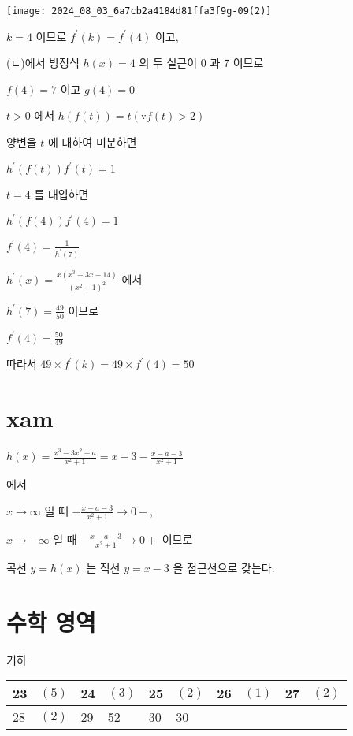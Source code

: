 \documentclass[10pt]{article}
\begin{document}
\begin{center}
\texttt{[image: 2024\_08\_03\_6a7cb2a4184d81ffa3f9g-09(2)]}
\end{center}

\(k=4\) 이므로 \(f^{\prime}(k)=f^{\prime}(4)\) 이고,

(ㄷ)에서 방정식 \(h(x)=4\) 의 두 실근이 0 과 7 이므로

\(f(4)=7\) 이고 \(g(4)=0\)

\(t>0\) 에서 \(h(f(t))=t(\because f(t)>2)\)

양변을 \(t\) 에 대하여 미분하면

\(h^{\prime}(f(t)) f^{\prime}(t)=1\)

\(t=4\) 를 대입하면

\(h^{\prime}(f(4)) f^{\prime}(4)=1\)

\(f^{\prime}(4)=\frac{1}{h^{\prime}(7)}\)

\(h^{\prime}(x)=\frac{x\left(x^{3}+3 x-14\right)}{\left(x^{2}+1\right)^{2}}\) 에서

\(h^{\prime}(7)=\frac{49}{50}\) 이므로

\(f^{\prime}(4)=\frac{50}{49}\)

따라서 \(49 \times f^{\prime}(k)=49 \times f^{\prime}(4)=50\)

\section*{xam}
\(h(x)=\frac{x^{3}-3 x^{2}+a}{x^{2}+1}=x-3-\frac{x-a-3}{x^{2}+1}\)

에서

\(x \rightarrow \infty\) 일 때 \(-\frac{x-a-3}{x^{2}+1} \rightarrow 0-\),

\(x \rightarrow-\infty\) 일 때 \(-\frac{x-a-3}{x^{2}+1} \rightarrow 0+\) 이므로

곡선 \(y=h(x)\) 는 직선 \(y=x-3\) 을 점근선으로 갖는다.

\section*{수학 영역}
기하

\begin{center}
\begin{tabular}{|l|l|l|l|l|l|l|l|l|l|}
\hline
23 & \((5)\) & 24 & \((3)\) & 25 & \((2)\) & 26 & \((1)\) & 27 & \((2)\) \\
\hline
28 & \((2)\) & 29 & 52 & 30 & 30 &  &  &  &  \\
\hline
\end{tabular}
\end{center}
\end{document}
